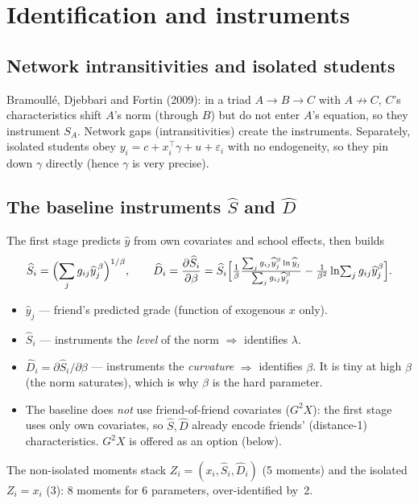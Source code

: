 \documentclass[11pt]{article}
\newcommand{\T}{^{\!\top}}
\newenvironment{where}{\par\nobreak\vspace{-0.2em}\begin{itemize}[leftmargin=1.5em,itemsep=1pt,topsep=2pt,parsep=0pt,label=\textcolor{accent}{\textbullet}]\small}{\end{itemize}\vspace{0.2em}}
\begin{document}
\section{Identification and instruments}
\subsection{Network intransitivities and isolated students}
Bramoull\'e, Djebbari and Fortin (2009): in a triad $A\!\to\!B\!\to\!C$ with $A\!\not\to\!C$, $C$'s characteristics shift $A$'s norm (through $B$) but do not enter $A$'s equation, so they instrument $S_A$. Network gaps (intransitivities) create the instruments. Separately, isolated students obey $y_i=c+x_i\T\gamma+u+\varepsilon_i$ with no endogeneity, so they pin down $\gamma$ directly (hence $\gamma$ is very precise).

\subsection{The baseline instruments $\widehat S$ and $\widehat D$}
The first stage predicts $\widehat y$ from own covariates and school effects, then builds
\begin{equation}
\widehat S_i=\Bigl(\sum_j g_{ij}\widehat y_j^{\,\beta}\Bigr)^{1/\beta},\qquad
\widehat D_i=\frac{\partial\widehat S_i}{\partial\beta}
=\widehat S_i\Bigl[\tfrac1\beta\tfrac{\sum_j g_{ij}\widehat y_j^{\beta}\ln\widehat y_j}{\sum_j g_{ij}\widehat y_j^{\beta}}-\tfrac1{\beta^2}\ln\!\textstyle\sum_j g_{ij}\widehat y_j^{\beta}\Bigr].
\end{equation}
\begin{where}
\item $\widehat y_j$ --- friend's predicted grade (function of exogenous $x$ only).
\item $\widehat S_i$ --- instruments the \emph{level} of the norm $\Rightarrow$ identifies $\lambda$.
\item $\widehat D_i=\partial\widehat S_i/\partial\beta$ --- instruments the \emph{curvature} $\Rightarrow$ identifies $\beta$. It is tiny at high $\beta$ (the norm saturates), which is why $\beta$ is the hard parameter.
\item The baseline does \emph{not} use friend-of-friend covariates ($G^2X$): the first stage uses only own covariates, so $\widehat S,\widehat D$ already encode friends' (distance-1) characteristics. $G^2X$ is offered as an option (below).
\end{where}
The non-isolated moments stack $Z_i=(x_i,\widehat S_i,\widehat D_i)$ (5 moments) and the isolated $Z_i=x_i$ (3): 8 moments for 6 parameters, over-identified by~2.
\end{document}
